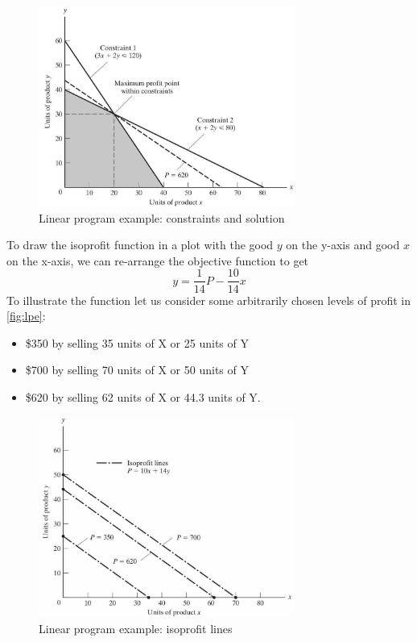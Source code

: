 \documentclass[
  12pt,
  oneside]{book}
\providecommand{\tightlist}{%
  \setlength{\itemsep}{0pt}\setlength{\parskip}{0pt}}
\theoremstyle{definition}
\theoremstyle{definition}
\theoremstyle{definition}
\theoremstyle{definition}
\theoremstyle{remark}
\begin{document}
\begin{figure}
\centering
\includegraphics[width=0.75\textwidth,height=\textheight]{fig/lpe2.jpg}
\caption{\label{fig:lpe2} Linear program example: constraints and solution}
\end{figure}

To draw the isoprofit function in a plot with the good \(y\) on the y-axis and good \(x\) on the x-axis, we can re-arrange the objective function to get \[y=\frac{1}{14}P-\frac{10}{14}x\]
To illustrate the function let us consider some arbitrarily chosen levels of profit in \autoref{fig:lpe}:

\begin{itemize}
\tightlist
\item
  \$350 by selling 35 units of X or 25 units of Y
\item
  \$700 by selling 70 units of X or 50 units of Y
\item
  \$620 by selling 62 units of X or 44.3 units of Y.
\end{itemize}

\begin{figure}
\centering
\includegraphics[width=0.75\textwidth,height=\textheight]{fig/lpe.jpg}
\caption{\label{fig:lpe} Linear program example: isoprofit lines}
\end{figure}
\end{document}
